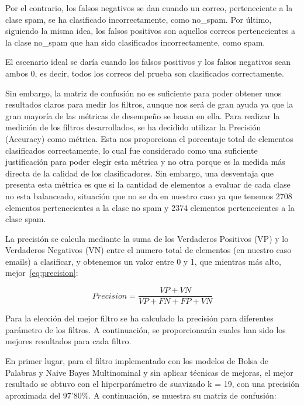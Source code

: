 \documentclass[conference,a4paper]{IEEEtran}
\begin{document}
Por el contrario, los falsos negativos se dan cuando un correo, perteneciente a la clase spam, se ha clasificado incorrectamente, como no\_spam. Por último, siguiendo la misma idea, los falsos positivos son aquellos correos pertenecientes a la clase no\_spam que han sido clasificados incorrectamente, como spam. 

El escenario ideal se daría cuando los falsos positivos y los falsos negativos sean ambos 0, es decir, todos los correos del prueba son clasificados correctamente.

Sin embargo, la matriz de confusión no es suficiente para poder obtener unos resultados claros para medir los filtros, aunque nos será de gran ayuda ya que la gran mayoría de las métricas de desempeño se basan en ella. Para realizar la medición de los filtros desarrollados, se ha decidido utilizar la Precisión (Accuracy) como métrica. Esta nos proporciona el porcentaje total de elementos clasificados correctamente, lo cual fue considerado como una suficiente justificación para poder elegir esta métrica y no otra porque es la medida más directa de la calidad de los clasificadores. Sin embargo, una desventaja que presenta esta métrica es que si la cantidad de elementos a evaluar de cada clase no esta balanceado, situación que no se da en nuestro caso ya que tenemos 2708 elementos pertenecientes a la clase no spam y 2374 elementos pertenecientes a la clase spam.

La precisión se calcula mediante la suma de los Verdaderos Positivos (VP) y lo Verdaderos Negativos (VN) entre el numero total de elementos (en nuestro caso emails) a clasificar, y obtenemos un valor entre 0 y 1, que mientras más alto, mejor~\eqref{eq:precision}:

\begin{center}
\begin{equation}
  \label{eq:precision}
  	Precision =  \dfrac{VP + VN}{VP + FN + FP + VN}
\end{equation}
\end{center}




Para la elección del mejor filtro se ha calculado la precisión para diferentes parámetro de los filtros. A continuación, se proporcionarán cuales han sido los mejores resultados para cada filtro.


En primer lugar, para el filtro implementado con los modelos de Bolsa de Palabras y Naive Bayes Multinominal y sin aplicar técnicas de mejoras, el mejor resultado se obtuvo con el hiperparámetro de suavizado k = 19, con una precisión aproximada del 97’80\%. A continuación, se muestra su matriz de confusión:
\end{document}
